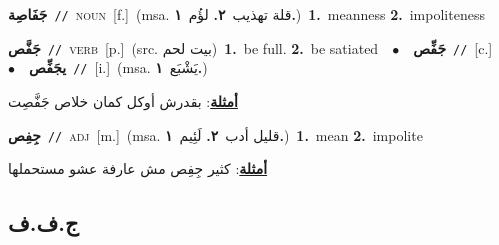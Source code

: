 \documentclass[10pt,a4paper,twoside]{article} %
\begin{document}
\begin{multicols}{2}
{\setlength\topsep{0pt}\textbf{\foreignlanguage{arabic}{جَفَاصِة}}\ {\color{gray}\texttt{//}\color{black}}\ \textsc{noun}\ [f.]\ \color{gray}(msa. \foreignlanguage{arabic}{قلة تهذيب}~\foreignlanguage{arabic}{\textbf{٢.}}  \foreignlanguage{arabic}{لؤُم}~\foreignlanguage{arabic}{\textbf{١.}})\color{black}\ \textbf{1.}~meanness  \textbf{2.}~impoliteness\ } \vspace{2mm}

{\setlength\topsep{0pt}\textbf{\foreignlanguage{arabic}{جَفَّص}}\ {\color{gray}\texttt{//}\color{black}}\ \textsc{verb}\ [p.]\ (src. \color{gray}\foreignlanguage{arabic}{بيت لحم}\color{black})\ \textbf{1.}~be full.  \textbf{2.}~be satiated\ \ $\bullet$\ \ \setlength\topsep{0pt}\textbf{\foreignlanguage{arabic}{جَفِّص}}\ {\color{gray}\texttt{//}\color{black}}\ [c.]\ \ $\bullet$\ \ \setlength\topsep{0pt}\textbf{\foreignlanguage{arabic}{يجَفِّص}}\ {\color{gray}\texttt{//}\color{black}}\ [i.]\ \color{gray}(msa. \foreignlanguage{arabic}{يَشْبَع}~\foreignlanguage{arabic}{\textbf{١.}})\color{black}\  \begin{flushright}\color{gray}\foreignlanguage{arabic}{\textbf{\underline{\foreignlanguage{arabic}{أمثلة}}}: بقدرش أوكل كمان خلاص جَفَّصِت}\end{flushright}\color{black}} \vspace{2mm}

{\setlength\topsep{0pt}\textbf{\foreignlanguage{arabic}{جِفِص}}\ {\color{gray}\texttt{//}\color{black}}\ \textsc{adj}\ [m.]\ \color{gray}(msa. \foreignlanguage{arabic}{قليل أدب}~\foreignlanguage{arabic}{\textbf{٢.}}  \foreignlanguage{arabic}{لَئِيم}~\foreignlanguage{arabic}{\textbf{١.}})\color{black}\ \textbf{1.}~mean  \textbf{2.}~impolite\  \begin{flushright}\color{gray}\foreignlanguage{arabic}{\textbf{\underline{\foreignlanguage{arabic}{أمثلة}}}: كثير جِفِص مش عارفة عشو مستحملها}\end{flushright}\color{black}} \vspace{2mm}

\vspace{-3mm}
\subsection*{\color{blue}\foreignlanguage{arabic}{ج.ف.ف}\color{blue}{}} 


\end{multicols}
\end{document}
